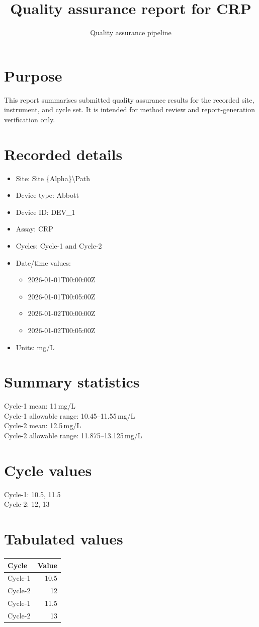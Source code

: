 \documentclass{article}
\title{Quality assurance report for CRP}
\author{Quality assurance pipeline}
\begin{document}
\maketitle

\section*{Purpose}
This report summarises submitted quality assurance results for the recorded site, instrument, and cycle set. It is intended for method review and report-generation verification only.

\section*{Recorded details}
\begin{itemize}
  \item Site: Site \{Alpha\}\textbackslash{}Path
  \item Device type: Abbott
  \item Device ID: DEV\_1
  \item Assay: CRP
  \item Cycles: Cycle-1 and Cycle-2
  \item Date/time values:
  \begin{itemize}
  \item 2026-01-01T00:00:00Z
  \item 2026-01-01T00:05:00Z
  \item 2026-01-02T00:00:00Z
  \item 2026-01-02T00:05:00Z
  \end{itemize}
  \item Units: mg/L
\end{itemize}

\section*{Summary statistics}
Cycle-1 mean: 11\,mg/L\\
Cycle-1 allowable range: 10.45--11.55\,mg/L\\
Cycle-2 mean: 12.5\,mg/L\\
Cycle-2 allowable range: 11.875--13.125\,mg/L

\section*{Cycle values}
Cycle-1: 10.5, 11.5\\
Cycle-2: 12, 13

\section*{Tabulated values}
\begin{tabular}{lr}
Cycle & Value \\ \hline
Cycle-1 & 10.5 \\
Cycle-2 & 12 \\
Cycle-1 & 11.5 \\
Cycle-2 & 13 \\
\end{tabular}
\end{document}
